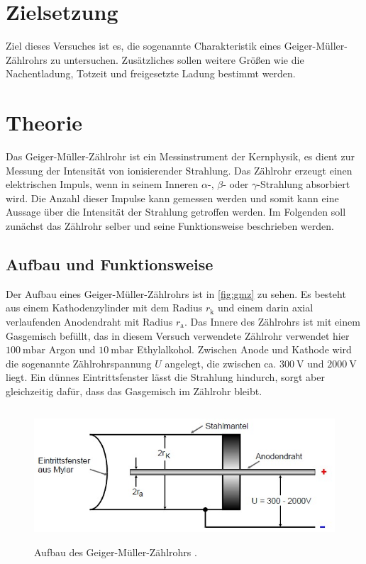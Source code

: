 \section{Zielsetzung}
Ziel dieses Versuches ist es, die sogenannte Charakteristik eines Geiger-Müller-Zählrohrs zu untersuchen.
Zusätzliches sollen weitere Größen wie die Nachentladung, Totzeit und freigesetzte Ladung
bestimmt werden.

\section{Theorie}
\label{sec:Theorie}
Das Geiger-Müller-Zählrohr ist ein Messinstrument der Kernphysik, es dient zur Messung der Intensität
von ionisierender Strahlung. Das Zählrohr erzeugt einen elektrischen Impuls, wenn in seinem Inneren
$\alpha$-, $\beta$- oder $\gamma$-Strahlung absorbiert wird.
Die Anzahl dieser Impulse kann gemessen werden und somit kann eine Aussage über die Intensität der Strahlung
getroffen werden.
Im Folgenden soll zunächst das Zählrohr selber und seine Funktionsweise beschrieben werden.

\subsection{Aufbau und Funktionsweise}

Der Aufbau eines Geiger-Müller-Zählrohrs ist in \autoref{fig:gmz} zu sehen.
Es besteht aus einem Kathodenzylinder mit dem Radius $r_\text{k}$ und einem darin axial verlaufenden
Anodendraht mit Radius $r_\text{a}$.
Das Innere des Zählrohrs ist mit einem Gasgemisch befüllt, das in diesem Versuch verwendete Zählrohr
verwendet hier $\qty{100}{\milli\bar}$ Argon und $\qty{10}{\milli\bar}$ Ethylalkohol.
Zwischen Anode und Kathode wird die sogenannte Zählrohrspannung $U$ angelegt, die zwischen
ca. $\qty{300}{\volt}$ und $\qty{2000}{\volt}$ liegt.
Ein dünnes Eintrittsfenster lässt die Strahlung hindurch, sorgt aber gleichzeitig dafür, dass das
Gasgemisch im Zählrohr bleibt.

\begin{figure}[H]
    \centering
    \includegraphics[height=5cm]{content/pics/gmz.jpg}
    \caption{Aufbau des Geiger-Müller-Zählrohrs \cite{v703}.}
    \label{fig:gmz}
\end{figure}

